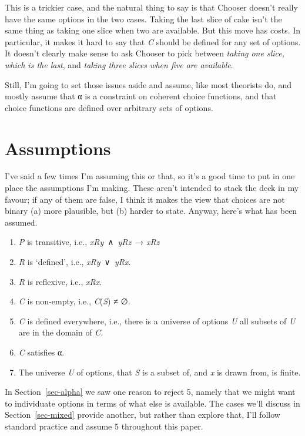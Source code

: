 \documentclass[
  11pt,
  letterpaper,
  DIV=11,
  numbers=noendperiod,
  twoside]{scrartcl}
\providecommand{\tightlist}{%
  \setlength{\itemsep}{0pt}\setlength{\parskip}{0pt}}
\begin{document}
This is a trickier case, and the natural thing to say is that Chooser
doesn't really have the same options in the two cases. Taking the last
slice of cake isn't the same thing as taking one slice when two are
available. But this move has costs. In particular, it makes it hard to
say that \emph{C} should be defined for any set of options. It doesn't
clearly make sense to ask Chooser to pick between \emph{taking one
slice, which is the last}, and \emph{taking three slices when five are
available}.

Still, I'm going to set those issues aside and assume, like most
theorists do, and mostly assume that α is a constraint on coherent
choice functions, and that choice functions are defined over arbitrary
sets of options.

\section{Assumptions}\label{sec-assumptions}

I've said a few times I'm assuming this or that, so it's a good time to
put in one place the assumptions I'm making. These aren't intended to
stack the deck in my favour; if any of them are false, I think it makes
the view that choices are not binary (a) more plausible, but (b) harder
to state. Anyway, here's what has been assumed.

\begin{enumerate}
\def\labelenumi{\arabic{enumi}.}
\tightlist
\item
  \emph{P} is transitive, i.e., \emph{xRy}~∧~\emph{yRz}~→ \emph{xRz}
\item
  \emph{R} is `defined', i.e., \emph{xRy}~∨~\emph{yRx}.
\item
  \emph{R} is reflexive, i.e., \emph{xRx}.
\item
  \emph{C} is non-empty, i.e., \emph{C}(\emph{S}) ≠ ∅.
\item
  \emph{C} is defined everywhere, i.e., there is a universe of options
  \emph{U} all subsets of \emph{U} are in the domain of \emph{C}.
\item
  \emph{C} satisfies α.
\item
  The universe \emph{U} of options, that \emph{S} is a subset of, and
  \emph{x} is drawn from, is finite.
\end{enumerate}

In Section~\ref{sec-alpha} we saw one reason to reject 5, namely that we
might want to individuate options in terms of what else is available.
The cases we'll discuss in Section~\ref{sec-mixed} provide another, but
rather than explore that, I'll follow standard practice and assume 5
throughout this paper.
\end{document}
